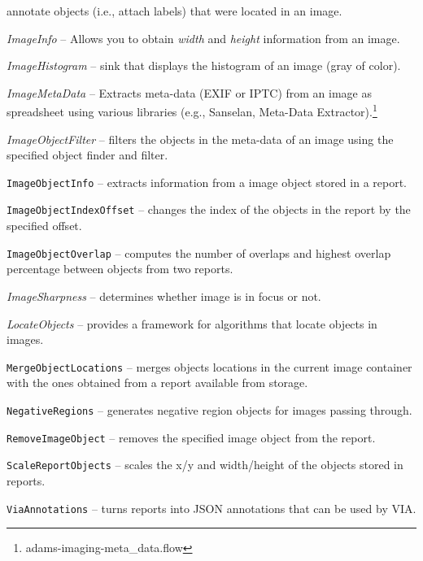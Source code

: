 \documentclass[a4paper]{book}
\begin{document}
\begin{tight_itemize}
   annotate objects (i.e., attach labels) that were located in an image.
  \item \textit{ImageInfo} -- Allows you to obtain \textit{width} and
  \textit{height} information from an image.
  \item \textit{ImageHistogram} -- sink that displays the histogram of an image
  (gray of color).
  \item \textit{ImageMetaData} -- Extracts meta-data (EXIF or IPTC) from an
  image as spreadsheet using various libraries (e.g., Sanselan\cite{sanselan},
  Meta-Data Extractor\cite{metadataextractor}).\footnote{adams-imaging-meta\_data.flow}
  \item \textit{ImageObjectFilter} -- filters the objects in the meta-data of an image
  using the specified object finder and filter.
  \item \texttt{ImageObjectInfo} -- extracts information from a image object
  stored in a report.
  \item \texttt{ImageObjectIndexOffset} -- changes the index of the objects in the
  report by the specified offset.
  \item \texttt{ImageObjectOverlap} -- computes the number of overlaps
  and highest overlap percentage between objects from two reports.
  \item \textit{ImageSharpness} -- determines whether image is in focus or not.
  \item \textit{LocateObjects} -- provides a framework for algorithms that
  locate objects in images.
  \item \texttt{MergeObjectLocations} -- merges objects locations
  in the current image container with the ones obtained from a report
  available from storage.
  \item \texttt{NegativeRegions} -- generates negative region objects
  for images passing through.
  \item \texttt{RemoveImageObject} -- removes the specified image object
  from the report.
  \item \texttt{ScaleReportObjects} -- scales the x/y and width/height
  of the objects stored in reports.
  \item \texttt{ViaAnnotations} -- turns reports into JSON annotations that
  can be used by VIA\cite{via}.
\end{tight_itemize}



\end{document}
